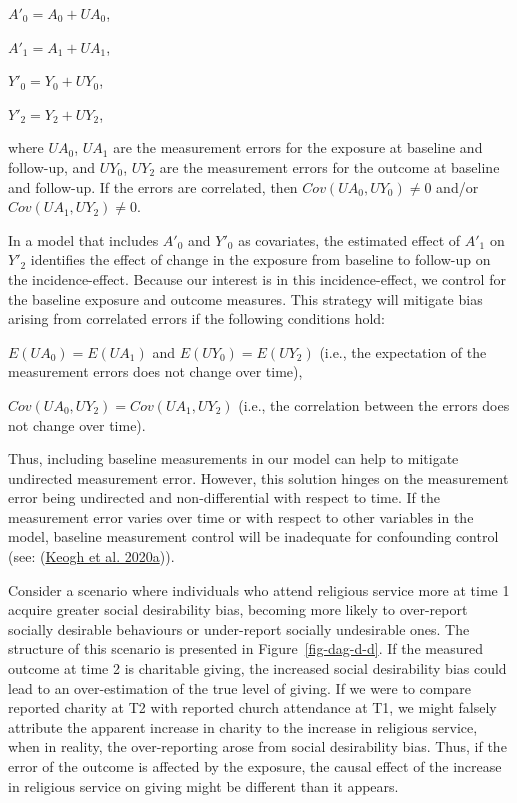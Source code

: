 \documentclass[
  singlecolumn]{report}
\begin{document}
\(A'_0 = A_0 + UA_0\),

\(A'_1 = A_1 + UA_1\),

\(Y'_0 = Y_0 + UY_0\),

\(Y'_2 = Y_2 + UY_2\),

where \(UA_0\), \(UA_1\) are the measurement errors for the exposure at
baseline and follow-up, and \(UY_0\), \(UY_2\) are the measurement
errors for the outcome at baseline and follow-up. If the errors are
correlated, then \(Cov(UA_0, UY_0) \neq 0\) and/or
\(Cov(UA_1, UY_2) \neq 0\).

In a model that includes \(A'_0\) and \(Y'_0\) as covariates, the
estimated effect of \(A'_1\) on \(Y'_2\) identifies the effect of change
in the exposure from baseline to follow-up on the incidence-effect.
Because our interest is in this incidence-effect, we control for the
baseline exposure and outcome measures. This strategy will mitigate bias
arising from correlated errors if the following conditions hold:

\(E(UA_0) = E(UA_1)\) and \(E(UY_0) = E(UY_2)\) (i.e., the expectation
of the measurement errors does not change over time),

\(Cov(UA_0, UY_2) = Cov(UA_1, UY_2)\) (i.e., the correlation between the
errors does not change over time).

Thus, including baseline measurements in our model can help to mitigate
undirected measurement error. However, this solution hinges on the
measurement error being undirected and non-differential with respect to
time. If the measurement error varies over time or with respect to other
variables in the model, baseline measurement control will be inadequate
for confounding control (see: (\protect\hyperlink{ref-keogh2020a}{Keogh
et al. 2020a})).

Consider a scenario where individuals who attend religious service more
at time 1 acquire greater social desirability bias, becoming more likely
to over-report socially desirable behaviours or under-report socially
undesirable ones. The structure of this scenario is presented in
Figure~\ref{fig-dag-d-d}. If the measured outcome at time 2 is
charitable giving, the increased social desirability bias could lead to
an over-estimation of the true level of giving. If we were to compare
reported charity at T2 with reported church attendance at T1, we might
falsely attribute the apparent increase in charity to the increase in
religious service, when in reality, the over-reporting arose from social
desirability bias. Thus, if the error of the outcome is affected by the
exposure, the causal effect of the increase in religious service on
giving might be different than it appears.
\end{document}
